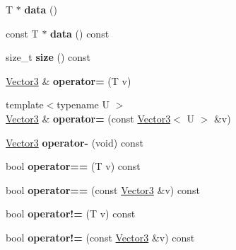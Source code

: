 \begin{DoxyCompactItemize}
\mbox{\label{struct_p_o_p_1_1_vector3_a0772e82b9f57ea326770120799ffd049}} 
T $\ast$ {\bfseries data} ()
\item 
\mbox{\label{struct_p_o_p_1_1_vector3_a5213a6c9510a3b194f3af077ed9cc826}} 
const T $\ast$ {\bfseries data} () const
\item 
\mbox{\label{struct_p_o_p_1_1_vector3_aaf3f6d6cb18a95eaa948c3a26d247b9f}} 
size\+\_\+t {\bfseries size} () const
\item 
\mbox{\label{struct_p_o_p_1_1_vector3_a9490d2f3a030bb32d7865eb07236c3ff}} 
\mbox{\hyperlink{struct_p_o_p_1_1_vector3}{Vector3}} \& {\bfseries operator=} (T v)
\item 
\mbox{\label{struct_p_o_p_1_1_vector3_acb212c80e162ac11227b35c97cca7f82}} 
{\footnotesize template$<$typename U $>$ }\\\mbox{\hyperlink{struct_p_o_p_1_1_vector3}{Vector3}} \& {\bfseries operator=} (const \mbox{\hyperlink{struct_p_o_p_1_1_vector3}{Vector3}}$<$ U $>$ \&v)
\item 
\mbox{\label{struct_p_o_p_1_1_vector3_ae73e988c25a5d10d016e1209617f5341}} 
\mbox{\hyperlink{struct_p_o_p_1_1_vector3}{Vector3}} {\bfseries operator-\/} (void) const
\item 
\mbox{\label{struct_p_o_p_1_1_vector3_a955c54b6953697456ba0e76439cd3572}} 
bool {\bfseries operator==} (T v) const
\item 
\mbox{\label{struct_p_o_p_1_1_vector3_a09ea8b766bb3eae34502be83911821c7}} 
bool {\bfseries operator==} (const \mbox{\hyperlink{struct_p_o_p_1_1_vector3}{Vector3}} \&v) const
\item 
\mbox{\label{struct_p_o_p_1_1_vector3_a42769e56d992dea341f94999a60f04be}} 
bool {\bfseries operator!=} (T v) const
\item 
\mbox{\label{struct_p_o_p_1_1_vector3_a3a5e9e206dedb6d48b04df0b96989f41}} 
bool {\bfseries operator!=} (const \mbox{\hyperlink{struct_p_o_p_1_1_vector3}{Vector3}} \&v) const

\end{DoxyCompactItemize}
